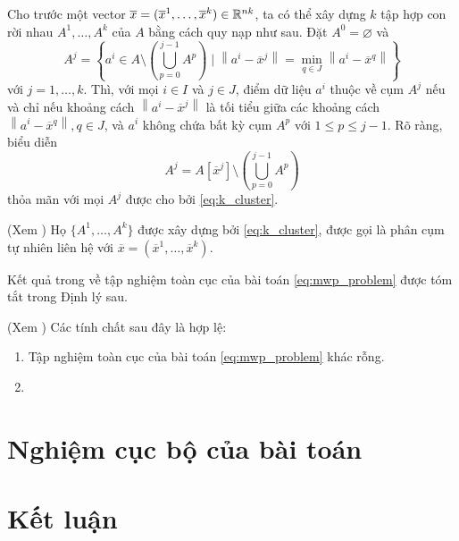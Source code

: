\documentclass[a4paper]{report}
\begin{document}
        Cho trước một vector $\overline{x} = (\overline{x}^1, \dots, \overline{x}^k) \in \mathbb{R}^{nk}$, ta có thể xây dựng $k$ tập hợp con rời nhau $A^1, \dots, A^k$ của $A$ bằng cách quy nạp như sau. Đặt $A^0 = \varnothing$ và 
        \begin{equation}
            \label{eq:k_cluster}
            A^j = \left\{ 
                a^i \in A \setminus \left(
                    \bigcup_{p=0}^{j-1}A^p
                \right)
                \mid \left\| a^i - \overline{x}^j\right\| = \min_{q \in J}\left\| a^i - \overline{x}^q\right\|   
            \right\}
        \end{equation}
        với $j = 1, \dots, k$. Thì, với mọi $i \in I$ và $j \in J$, điểm dữ liệu $a^i$ thuộc về cụm $A^j$ nếu và chỉ nếu khoảng cách $\left\| a^i - \overline{x}^j\right\|$ là tối tiểu giữa các khoảng cách $\left\| a^i - \overline{x}^q\right\|, q \in J$, và $a^i$ không chứa bất kỳ cụm $A^p$ với $1 \leq p \leq j -1$. Rõ ràng, biểu diễn 
        \begin{equation}
            A^j = A[\overline{x}^j] \setminus \left(
                \bigcup_{p=0}^{j-1}A^p
            \right)
        \end{equation}
        thỏa mãn với mọi $A^j$ được cho bởi \eqref{eq:k_cluster}.

        \begin{definition}
            (Xem \cite{cuong2020qualitative,cuong2023global}) Họ $\{A^1, \dots, A^k\}$ được xây dựng bởi \eqref{eq:k_cluster}, được gọi là phân cụm tự nhiên liên hệ với $\overline{x} = (\overline{x}^1, \dots, \overline{x}^k)$.
        \end{definition}

        Kết quả trong \cite{cuong2024local} về tập nghiệm toàn cục của bài toán \eqref{eq:mwp_problem} được tóm tắt trong Định lý sau.


        \begin{theorem}
            (Xem \cite[Phần 3]{cuong2024local}) Các tính chất sau đây là hợp lệ:
            \begin{enumerate}[label=(\alph*)]
                \item Tập nghiệm toàn cục của bài toán \eqref{eq:mwp_problem} khác rỗng.
                \item 
            \end{enumerate}
        \end{theorem}

    \chapter{Nghiệm cục bộ của bài toán}


    \chapter{Kết luận}


    \nocite{*}
\end{document}
